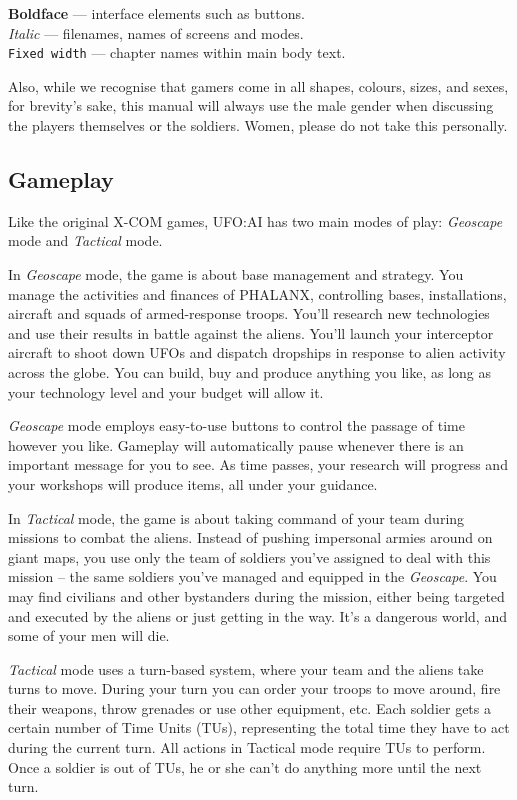 \textbf{Boldface} --- interface elements such as buttons.\\
\emph{Italic} --- filenames, names of screens and modes.\\
\texttt{Fixed width} --- chapter names within main body text.

Also, while we recognise that gamers come in all shapes, colours, sizes, and sexes, for brevity's sake, this manual will always use the male gender when discussing the players themselves or the soldiers.  Women, please do not take this personally.

\subsection{Gameplay}
Like the original X-COM games, UFO:AI has two main modes of play: \emph{Geoscape} mode and \emph{Tactical} mode.

In \emph{Geoscape} mode, the game is about base management and strategy. You manage the activities and finances of PHALANX, controlling bases, installations, aircraft and squads of armed-response troops. You'll research new technologies and use their results in battle against the aliens. You'll launch your interceptor aircraft to shoot down UFOs and dispatch dropships in response to alien activity across the globe. You can build, buy and produce anything you like, as long as your technology level and your budget will allow it.

\emph{Geoscape} mode employs easy-to-use buttons to control the passage of time however you like.  Gameplay will  automatically pause whenever there is an important message for you to see. As time passes, your research will progress and your workshops will produce items, all under your guidance.

In \emph{Tactical} mode, the game is about taking command of your team during missions to combat the aliens. Instead of pushing impersonal armies around on giant maps, you use only the team of soldiers you've assigned to deal with this mission -- the same soldiers you've managed and equipped in the \emph{Geoscape}. You may find civilians and other bystanders during the mission, either being targeted and executed by the aliens or just getting in the way. It's a dangerous world, and some of your men will die.

\emph{Tactical} mode uses a turn-based system, where your team and the aliens take turns to move. During your turn you can order your troops to move around, fire their weapons, throw grenades or use other equipment, etc. Each soldier gets a certain number of Time Units (TUs), representing the total time they have to act during the current turn. All actions in Tactical mode require TUs to perform. Once a soldier is out of TUs, he or she can't do anything more until the next turn.

